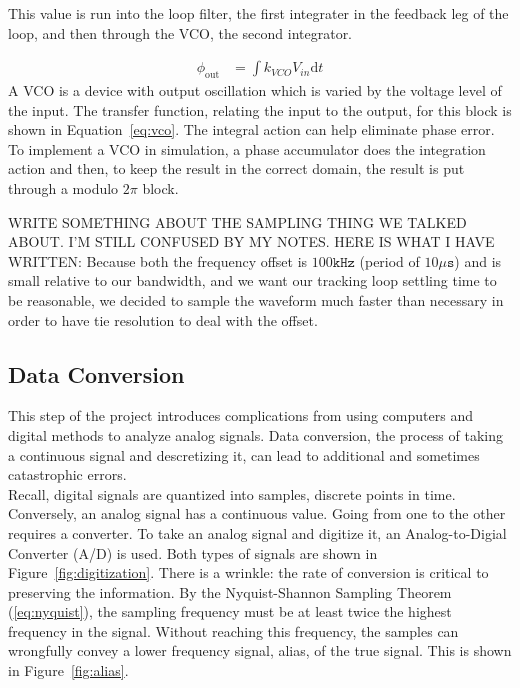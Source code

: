 \documentclass[]{article}
\begin{document}
This value is run into the loop filter, the first integrater in the feedback leg of the loop, and then through the VCO, the second integrator.
  
\begin{align}
\label{eq:vco}
\phi_{\text{out}} &= \int \! k_{VCO}V_{in} \mathrm{d}t
\end{align}
A VCO is a device with output oscillation which is varied by the voltage level of the input.  The transfer function, relating the input to the output, for this block is shown in Equation~\ref{eq:vco}. The integral action can help eliminate phase error. To implement a VCO in simulation, a phase accumulator does the integration action and then, to keep the result in the correct domain, the result is put through a modulo $2\pi$ block.   

WRITE SOMETHING ABOUT THE SAMPLING THING WE TALKED ABOUT.  I'M STILL CONFUSED BY MY NOTES.  HERE IS WHAT I HAVE WRITTEN: Because both the frequency offset is $100 \mathtt{kHz}$ (period of $10 \mathtt{\mu s}$) and is small relative to our bandwidth, and we want our tracking loop settling time to be reasonable, we decided to sample the waveform much faster than necessary in order to have tie resolution to deal with the offset.


\subsection{Data Conversion}
\label{sec:converter}
This step of the project introduces complications from using computers and digital methods to analyze analog signals.  Data conversion, the process of taking a continuous signal and descretizing it, can lead to additional and sometimes catastrophic errors.\\

Recall, digital signals are quantized into samples, discrete points in time.  Conversely, an analog signal has a continuous value.  Going from one to the other requires a converter.  To take an analog signal and digitize it, an Analog-to-Digial Converter (A/D) is used.  Both types of signals are shown in Figure~\ref{fig:digitization}.  There is a wrinkle: the rate of conversion is critical to preserving the information.  By the Nyquist-Shannon Sampling Theorem (\ref{eq:nyquist}), the sampling frequency must be at least twice the highest frequency in the signal.  Without reaching this frequency, the samples can wrongfully convey a lower frequency signal, alias, of the true signal.  This is shown in Figure~\ref{fig:alias}.  
\end{document}
